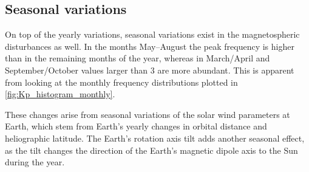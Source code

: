 \subsection{Seasonal variations}
On top of the yearly variations, seasonal variations exist in the magnetospheric disturbances as well. In the months May--August the \Kp{} peak frequency is higher than in the remaining months of the year, whereas in March/April and September/October \Kp{} values larger than 3 are more abundant. This is apparent from looking at the monthly \Kp{} frequency distributions plotted in \autoref{fig:Kp_histogram_monthly}.
\begin{figure}[htb]
	\begin{floatrow}
	\end{floatrow}
\end{figure}
These \Kp{} changes arise from seasonal variations of the solar wind parameters at Earth, which stem from Earth's yearly changes in orbital distance and heliographic latitude. The Earth's rotation axis tilt adds another seasonal effect, as the tilt changes the direction of the Earth's magnetic dipole axis to the Sun during the year.


